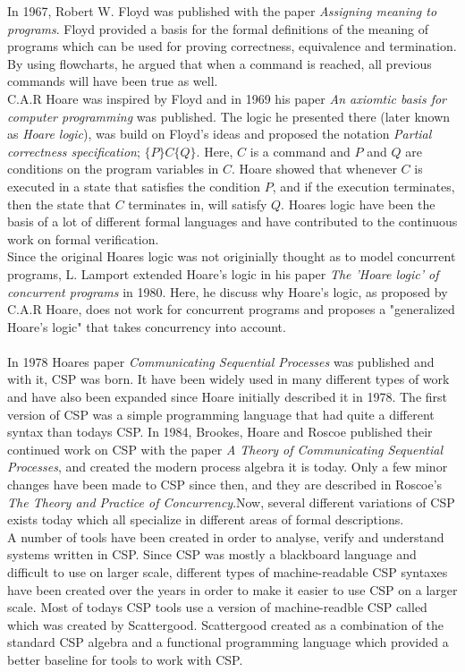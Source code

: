 In 1967, Robert W. Floyd was published with the paper \textit{Assigning meaning to programs}\cite{Floyd1967}. Floyd provided a basis for the formal definitions of the meaning of programs which can be used for proving correctness, equivalence and termination. By using flowcharts, he argued that when a command is reached, all previous commands will have been true as well.\\ C.A.R Hoare was inspired by Floyd and in 1969 his paper \textit{An axiomtic basis for computer programming}\cite{Hoare1969} was published. The logic he presented there (later known as \textit{Hoare logic}), was build on Floyd's ideas and proposed the notation \textit{Partial correctness specification}; $\{P\} C \{Q\}$. Here, $C$ is a command and $P$ and $Q$ are conditions on the program variables in $C$. Hoare showed that whenever $C$ is executed in a state that satisfies the condition $P$, and if the execution terminates, then the state that $C$ terminates in, will satisfy $Q$. Hoares logic have been the basis of a lot of different formal languages and have contributed to the continuous work on formal verification. \\
Since the original Hoares logic was not originially thought as to model concurrent programs, L. Lamport extended Hoare's logic in his paper \textit{The 'Hoare logic' of concurrent programs}\cite{Lamport1980} in 1980. Here, he discuss why Hoare's logic, as proposed by C.A.R Hoare, does not work for concurrent programs and proposes a "generalized Hoare's logic" that takes concurrency into account. \\\\
In 1978 Hoares paper \textit{Communicating Sequential Processes} was published and with it, CSP was born. It have been widely used in many different types of work and have also been expanded since Hoare initially described it in 1978\cite{Abdallah2005}. The first version of CSP was a simple programming language that had quite a different syntax than todays CSP. In 1984, Brookes, Hoare and Roscoe published their continued work on CSP with the paper \textit{A Theory of Communicating Sequential Processes}\cite{Brookes1984}, and created the modern process algebra it is today. Only a few minor changes have been made to CSP since then, and they are described in Roscoe's \textit{The Theory and Practice of Concurrency}\cite{Roscoe1997}.Now, several different variations of CSP exists today which all specialize in different areas of formal descriptions.\\
A number of tools have been created in order to analyse, verify and understand systems written in CSP. Since CSP was mostly a blackboard language and difficult to use on larger scale, different types of machine-readable CSP syntaxes have been created over the years in order to make it easier to use CSP on a larger scale. Most of todays CSP tools use a version of machine-readble CSP called \cspm{} which was created by Scattergood\cite{Scattergood1998}. Scattergood created \cspm{} as a combination of the standard CSP algebra and a functional programming language which provided a better baseline for tools to work with CSP.\\

